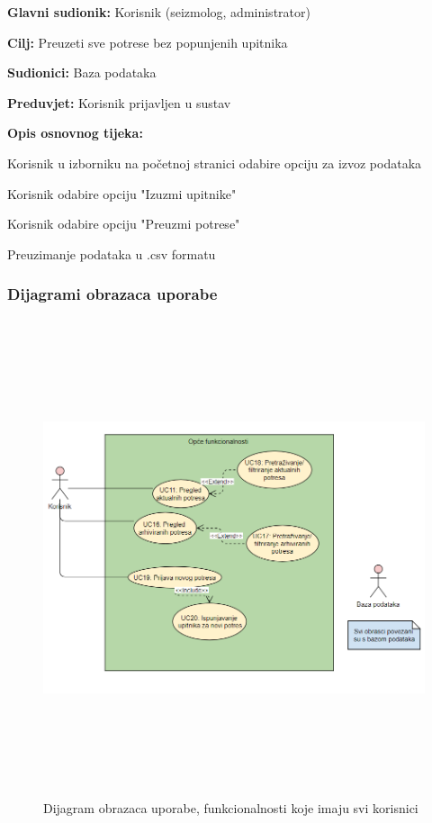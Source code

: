 			\noindent {}
			\begin{packed_item}
				
				\item \textbf{Glavni sudionik:} Korisnik (seizmolog, administrator)
				\item \textbf{Cilj:} Preuzeti sve potrese bez popunjenih upitnika
				\item \textbf{Sudionici:} Baza podataka
				\item \textbf{Preduvjet:} Korisnik prijavljen u sustav
				\item \textbf{Opis osnovnog tijeka:}
				
				\item[] \begin{packed_enum}
					\item Korisnik u izborniku na početnoj stranici odabire opciju za izvoz podataka
					\item Korisnik odabire opciju "Izuzmi upitnike"
					\item Korisnik odabire opciju "Preuzmi potrese"
					\item Preuzimanje podataka u .csv formatu
				\end{packed_enum}
				
			\end{packed_item}
					
				\subsubsection{Dijagrami obrazaca uporabe}
					
				\begin{figure}[H]
					\includegraphics[width=\textwidth, height = 14cm]{slike/prvinovi.PNG} 
					 \caption{Dijagram obrazaca uporabe, funkcionalnosti koje imaju svi korisnici}
					  \label{fig:obrasci1} 
				  \end{figure}
				  
